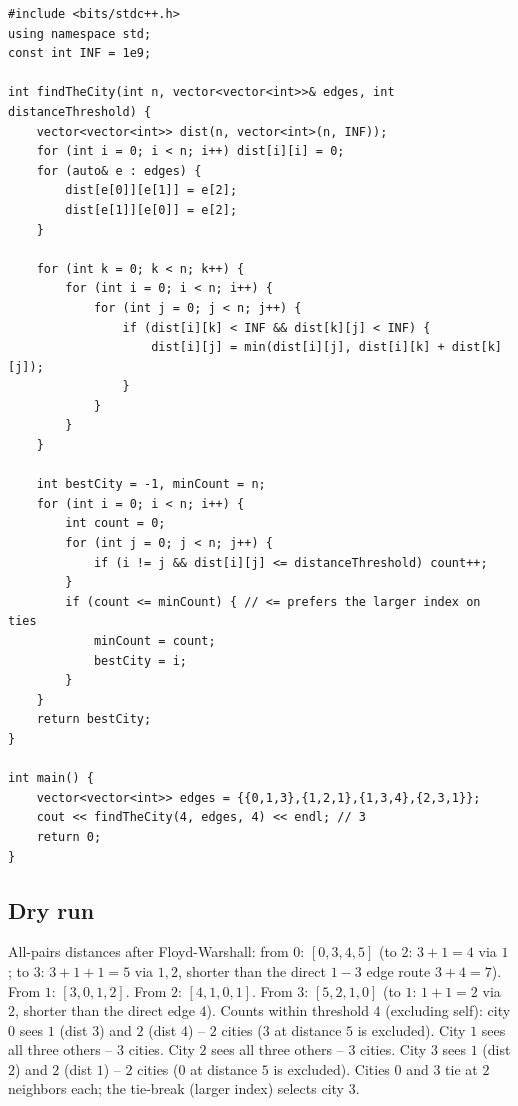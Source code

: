 \begin{lstlisting}
#include <bits/stdc++.h>
using namespace std;
const int INF = 1e9;

int findTheCity(int n, vector<vector<int>>& edges, int distanceThreshold) {
    vector<vector<int>> dist(n, vector<int>(n, INF));
    for (int i = 0; i < n; i++) dist[i][i] = 0;
    for (auto& e : edges) {
        dist[e[0]][e[1]] = e[2];
        dist[e[1]][e[0]] = e[2];
    }

    for (int k = 0; k < n; k++) {
        for (int i = 0; i < n; i++) {
            for (int j = 0; j < n; j++) {
                if (dist[i][k] < INF && dist[k][j] < INF) {
                    dist[i][j] = min(dist[i][j], dist[i][k] + dist[k][j]);
                }
            }
        }
    }

    int bestCity = -1, minCount = n;
    for (int i = 0; i < n; i++) {
        int count = 0;
        for (int j = 0; j < n; j++) {
            if (i != j && dist[i][j] <= distanceThreshold) count++;
        }
        if (count <= minCount) { // <= prefers the larger index on ties
            minCount = count;
            bestCity = i;
        }
    }
    return bestCity;
}

int main() {
    vector<vector<int>> edges = {{0,1,3},{1,2,1},{1,3,4},{2,3,1}};
    cout << findTheCity(4, edges, 4) << endl; // 3
    return 0;
}
\end{lstlisting}

\subsection*{Dry run}


All-pairs distances after Floyd-Warshall: from $0$: $[0,3,4,5]$ (to
$2$: $3+1=4$ via $1$; to $3$: $3+1+1=5$ via $1,2$, shorter than the
direct $1{-}3$ edge route $3+4=7$). From $1$: $[3,0,1,2]$. From $2$:
$[4,1,0,1]$. From $3$: $[5,2,1,0]$ (to $1$: $1+1=2$ via $2$, shorter
than the direct edge $4$). Counts within threshold $4$ (excluding
self): city $0$ sees $1$ (dist $3$) and $2$ (dist $4$) -- $2$ cities
($3$ at distance $5$ is excluded). City $1$ sees all three others --
$3$ cities. City $2$ sees all three others -- $3$ cities. City $3$
sees $1$ (dist $2$) and $2$ (dist $1$) -- $2$ cities ($0$ at distance
$5$ is excluded). Cities $0$ and $3$ tie at $2$ neighbors each; the
tie-break (larger index) selects city $3$.

